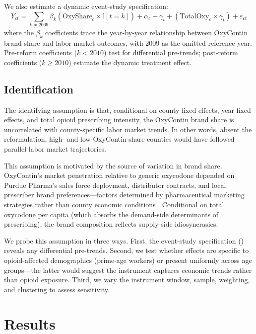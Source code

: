 \documentclass[12pt]{article}
\newcommand{\ind}{\mathbb{I}}
\begin{document}
We also estimate a dynamic event-study specification:
\begin{equation}
Y_{ct} = \sum_{k \neq 2009} \beta_k \left(\text{OxyShare}_c \times \ind[t = k]\right) + \alpha_c + \gamma_t + \left(\text{TotalOxy}_c \times \gamma_t\right) + \varepsilon_{ct}
\label{eq:eventstudy}
\end{equation}
where the $\beta_k$ coefficients trace the year-by-year relationship between OxyContin brand share and labor market outcomes, with 2009 as the omitted reference year. Pre-reform coefficients ($k < 2010$) test for differential pre-trends; post-reform coefficients ($k \geq 2010$) estimate the dynamic treatment effect.

\subsection{Identification}

The identifying assumption is that, conditional on county fixed effects, year fixed effects, and total opioid prescribing intensity, the OxyContin brand share is uncorrelated with county-specific labor market trends. In other words, absent the reformulation, high- and low-OxyContin-share counties would have followed parallel labor market trajectories.

This assumption is motivated by the source of variation in brand share. OxyContin's market penetration relative to generic oxycodone depended on Purdue Pharma's sales force deployment, distributor contracts, and local prescriber brand preferences---factors determined by pharmaceutical marketing strategies rather than county economic conditions \citep{alpert2018, van2019}. Conditional on total oxycodone per capita (which absorbs the demand-side determinants of prescribing), the brand composition reflects supply-side idiosyncrasies.

We probe this assumption in three ways. First, the event-study specification () reveals any differential pre-trends. Second, we test whether effects are specific to opioid-affected demographics (prime-age workers) or present uniformly across age groups---the latter would suggest the instrument captures economic trends rather than opioid exposure. Third, we vary the instrument window, sample, weighting, and clustering to assess sensitivity.


\section{Results}
\label{sec:results}
\end{document}
